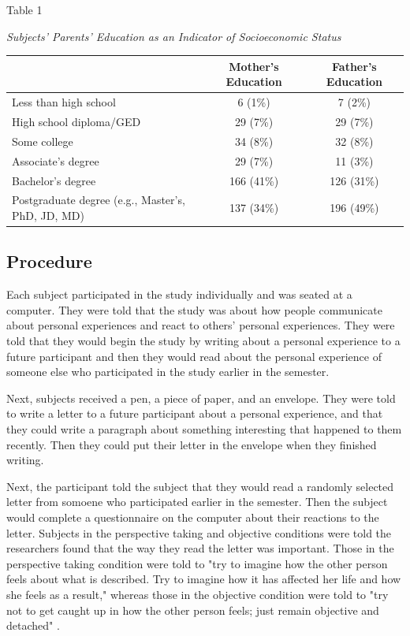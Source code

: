 \documentclass[man,a4paper,noextraspace,apacite]{apa6}\usepackage[]{graphicx}\usepackage[]{color}
\begin{document}
\begin{table}
  Table 1
  
  \textit{Subjects' Parents' Education as an Indicator of Socioeconomic Status}

  \begin{tabular}{l c c}
     \hline
     & Mother's Education & Father's Education \\
     \hline
     Less than high school & 
        6 (1\%) & 
        7 (2\%) \\
     High school diploma/GED & 
        29 (7\%) & 
        29 (7\%) \\
     Some college & 
        34 (8\%) & 
        32 (8\%) \\
     Associate's degree & 
        29 (7\%) & 
        11 (3\%) \\
     Bachelor's degree & 
        166 (41\%) & 
        126 (31\%) \\
     Postgraduate degree (e.g., Master's, PhD, JD, MD) & 
        137 (34\%) & 
        196 (49\%) \\
     \hline
  \end{tabular}

\end{table}

\subsection{Procedure}
Each subject participated in the study individually and was seated at a computer. They were told that the study was about how people communicate about personal experiences and react to others' personal experiences. They were told that they would begin the study by writing about a personal experience to a future participant and then they would read about the personal experience of someone else who participated in the study earlier in the semester.

Next, subjects received a pen, a piece of paper, and an envelope. They were told to write a letter to a future participant about a personal experience, and that they could write a paragraph about something interesting that happened to them recently. Then they could put their letter in the envelope when they finished writing. 

Next, the participant told the subject that they would read a randomly selected letter from somoene who participated earlier in the semester. Then the subject would complete a questionnaire on the computer about their reactions to the letter. Subjects in the perspective taking and objective conditions were told the researchers found that the way they read the letter was important. Those in the perspective taking condition were told to "try to imagine how the other person feels about what is described. Try to imagine how it has affected her life and how she feels as a result," whereas those in the objective condition were told to "try not to get caught up in how the other person feels; just remain objective and detached" \cite{Batson2002, Batson2007}.
\end{document}
